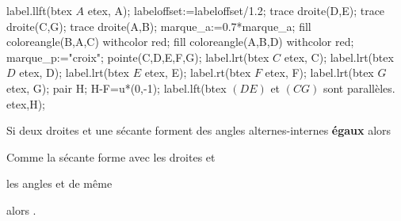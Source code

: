 \begin{changemargin}{-10mm}{-20mm}
\begin{activite}
\begin{exemple*1}
\begin{minipage}{0.15\linewidth}
\begin{center}
{\begin{Geometrie}[CoinBG={(-1.5u,-1.5u)},CoinHD={(8u,2.5u)}]
                            label.llft(btex $A$ etex, A);
                            labeloffset:=labeloffset/1.2;
                            trace droite(D,E);
                            trace droite(C,G);
                            trace droite(A,B);
                            marque_a:=0.7*marque_a;
                            fill coloreangle(B,A,C) withcolor red;
                            fill coloreangle(A,B,D) withcolor red;
                            marque_p:="croix";
                            pointe(C,D,E,F,G);
                            label.lrt(btex $C$ etex, C);
                            label.lrt(btex $D$ etex, D);
                            label.lrt(btex $E$ etex, E);
                            label.rt(btex $F$ etex, F);
                            label.lrt(btex $G$ etex, G);
                            pair H;
                            H-F=u*(0,-1);
                            label.lft(btex $(DE)$ et $(CG)$  sont parallèles. etex,H);
                        \end{Geometrie}        
                    }
                \end{center}
            \end{minipage}
        \end{exemple*1}
        \begin{propriete}
            Si deux droites et une sécante forment des angles alternes-internes \textbf{égaux} alors
            \par\medskip\pointilles
            \par\medskip\pointilles            
            \medskip
        \end{propriete}
        \begin{exemple*1}
            \phantom{rrr}\par\bigskip
            \begin{minipage}{0.8\linewidth}
                Comme la sécante \pointilles[15mm] forme avec les droites \pointilles[15mm] et \pointilles[15mm] \par\medskip
                les angles \pointilles[40mm] et \pointilles[15mm] de même \pointilles[20mm] \par\medskip alors \pointilles.                
            \end{minipage}
            \begin{minipage}{0.15\linewidth}
                \vspace*{-15mm}
                \begin{center}

\end{center}
\end{minipage}
\end{exemple*1}
\end{activite}
\end{changemargin}
